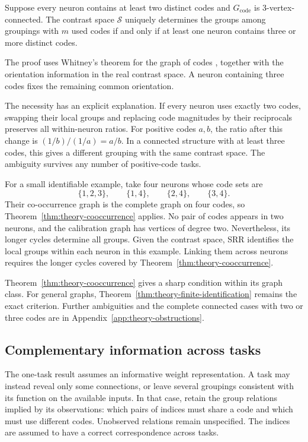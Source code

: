\begin{theorem}
    \label{thm:theory-cooccurrence}
    Suppose every neuron contains at least two distinct codes and
    $G_{\mathrm{code}}$ is 3-vertex-connected.
    The contrast space $\mathcal S$ uniquely determines
    the groups among groupings with $m$ used codes if and only if
    at least one neuron contains three or more distinct codes.
\end{theorem}

The proof uses Whitney's theorem for the graph of codes
\cite{fomin2020whitney}, together with the orientation information
in the real contrast space. A neuron containing three codes fixes
the remaining common orientation.

The necessity has an explicit explanation. If every neuron uses
exactly two codes, swapping their local groups and replacing code
magnitudes by their reciprocals preserves all within-neuron ratios.
For positive codes $a,b$, the ratio after this change is
$(1/b)/(1/a)=a/b$. In a connected structure with at least three
codes, this gives a different grouping with the same contrast space.
The ambiguity survives any number of positive-code tasks.

For a small identifiable example, take four neurons whose code
sets are
$$
    \{1,2,3\},\qquad\{1,4\},\qquad
    \{2,4\},\qquad\{3,4\}.
$$
Their co-occurrence graph is the complete graph on four codes,
so Theorem~\ref{thm:theory-cooccurrence} applies. No pair of codes
appears in two neurons, and the calibration graph has vertices
of degree two. Nevertheless, its longer cycles determine all groups.
Given the contrast space, SRR identifies the local groups within each
neuron in this example. Linking them across neurons requires the
longer cycles covered by
Theorem~\ref{thm:theory-cooccurrence}.

Theorem~\ref{thm:theory-cooccurrence} gives a sharp condition within
its graph class. For general graphs, Theorem~\ref{thm:theory-finite-identification}
remains the exact criterion. Further ambiguities and the complete
connected cases with two or three codes are in
Appendix~\ref{app:theory-obstructions}.

\subsection{Complementary information across tasks}
\label{sec:theory-complementarity}

The one-task result assumes an informative weight representation.
A task may instead reveal only some connections, or leave several
groupings consistent with its function on the available inputs.
In that case, retain the group relations implied by its observations:
which pairs of indices must share a code and which must use different
codes. Unobserved relations remain unspecified.
The indices are assumed to have a correct correspondence across tasks.

